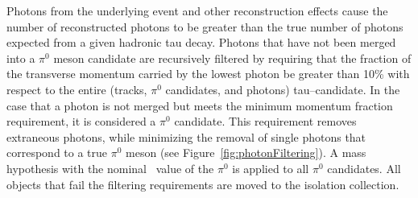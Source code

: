 Photons from the underlying event and other reconstruction effects cause the
number of reconstructed photons to be greater than the true number of photons
expected from a given hadronic tau decay.  Photons that have not been merged into
a $\pi^0$ meson candidate are recursively filtered by requiring that the
fraction of the transverse momentum carried by the lowest \pt photon be
greater than 10\% with respect to the entire (tracks, $\pi^0$ candidates, and
photons) tau--candidate. In the case that a photon is not merged but meets the
minimum momentum fraction requirement, it is considered a $\pi^0$
candidate.  This requirement removes extraneous photons, while minimizing the
removal of single photons that correspond to a true $\pi^0$ meson
(see Figure~\ref{fig:photonFiltering}). A mass hypothesis with the
nominal~\cite{PDG} value of the $\pi^0$ is applied to all $\pi^0$ candidates.
All objects that fail the filtering requirements are moved to the isolation
collection.

